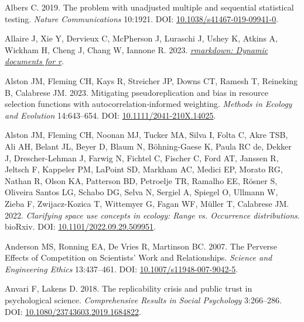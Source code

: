 \documentclass[10pt,a4paper]{article}
\newlength{\cslhangindent}
\newlength{\cslentryspacingunit} %
\newenvironment{CSLReferences}[2] %
 {%
  \setlength{\parindent}{0pt}
  \ifodd #1
  \let\oldpar\par
  \def\par{\hangindent=\cslhangindent\oldpar}
  \fi
  \setlength{\parskip}{#2\cslentryspacingunit}
 }%
 {}
\begin{document}
\hypertarget{refs}{}
\begin{CSLReferences}{1}{0}
\leavevmode{}%
Albers C. 2019. The problem with unadjusted multiple and sequential statistical testing. \emph{Nature Communications} 10:1921. DOI: \href{https://doi.org/10.1038/s41467-019-09941-0}{10.1038/s41467-019-09941-0}.

\leavevmode{}%
Allaire J, Xie Y, Dervieux C, McPherson J, Luraschi J, Ushey K, Atkins A, Wickham H, Cheng J, Chang W, Iannone R. 2023. \emph{\href{https://github.com/rstudio/rmarkdown}{{rmarkdown}: Dynamic documents for r}}.

\leavevmode{}%
Alston JM, Fleming CH, Kays R, Streicher JP, Downs CT, Ramesh T, Reineking B, Calabrese JM. 2023. Mitigating pseudoreplication and bias in resource selection functions with autocorrelation‐informed weighting. \emph{Methods in Ecology and Evolution} 14:643--654. DOI: \href{https://doi.org/10.1111/2041-210X.14025}{10.1111/2041-210X.14025}.

\leavevmode{}%
Alston JM, Fleming CH, Noonan MJ, Tucker MA, Silva I, Folta C, Akre TSB, Ali AH, Belant JL, Beyer D, Blaum N, Böhning-Gaese K, Paula RC de, Dekker J, Drescher-Lehman J, Farwig N, Fichtel C, Fischer C, Ford AT, Janssen R, Jeltsch F, Kappeler PM, LaPoint SD, Markham AC, Medici EP, Morato RG, Nathan R, Olson KA, Patterson BD, Petroelje TR, Ramalho EE, Rösner S, Oliveira Santos LG, Schabo DG, Selva N, Sergiel A, Spiegel O, Ullmann W, Zieba F, Zwijacz-Kozica T, Wittemyer G, Fagan WF, Müller T, Calabrese JM. 2022. \emph{Clarifying space use concepts in ecology: Range vs. Occurrence distributions}. bioRxiv. DOI: \href{https://doi.org/10.1101/2022.09.29.509951}{10.1101/2022.09.29.509951}.

\leavevmode{}%
Anderson MS, Ronning EA, De Vries R, Martinson BC. 2007. The {Perverse} {Effects} of {Competition} on {Scientists}' {Work} and {Relationships}. \emph{Science and Engineering Ethics} 13:437--461. DOI: \href{https://doi.org/10.1007/s11948-007-9042-5}{10.1007/s11948-007-9042-5}.

\leavevmode{}%
Anvari F, Lakens D. 2018. The replicability crisis and public trust in psychological science. \emph{Comprehensive Results in Social Psychology} 3:266--286. DOI: \href{https://doi.org/10.1080/23743603.2019.1684822}{10.1080/23743603.2019.1684822}.


\end{CSLReferences}
\end{document}
